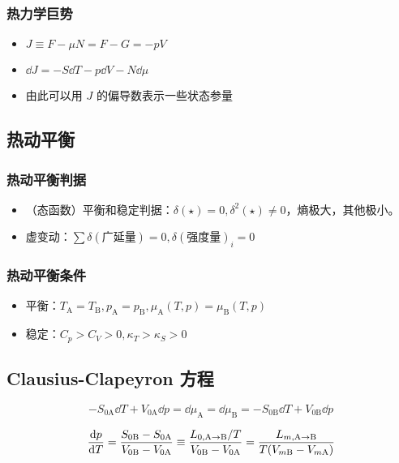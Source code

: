 \subsubsection{热力学巨势}
\begin{itemize}
    \item $J \equiv F - \mu N = F - G = - p V$
    \item $\dd{J} = -S \dd{T} - p \dd{V} - N \dd{\mu}$
    \item 由此可以用 $J$ 的偏导数表示一些状态参量
\end{itemize}

\subsection{热动平衡}

\subsubsection{热动平衡判据}

\begin{itemize}
    \item （态函数）平衡和稳定判据：$\delta (\star) = 0, \delta^2 (\star) \neq 0$，熵极大，其他极小。
    \item 虚变动：$\sum \delta (\text{广延量}) = 0, \delta (\text{强度量})_i = 0$
\end{itemize}

\subsubsection{热动平衡条件}

\begin{itemize}
    \item 平衡：$T_{\text{A}} = T_{\text{B}}, p_{\text{A}} = p_{\text{B}}, \mu_{\text{A}} (T, p) = \mu_{\text{B}} (T, p)$
    \item 稳定：$C_p > C_V > 0, \kappa_T > \kappa_S > 0$
\end{itemize}

\subsection{Clausius-Clapeyron 方程}

\[
    - S_{0\text{A}} \dd{T} + V_{0\text{A}} \dd{p} = \dd{\mu_\text{A}} = \dd{\mu_\text{B}} = - S_{0\text{B}} \dd{T} + V_{0\text{B}} \dd{p}
\]

\[
    \dv{p}{T} = \frac{S_{0\text{B}} - S_{0\text{A}}}{V_{0\text{B}} - V_{0\text{A}}} \equiv \frac{L_{0, \text{A} \rightarrow \text{B}} / T}{V_{0\text{B}} - V_{0\text{A}}} = \frac{L_{m, \text{A} \rightarrow \text{B}}}{T (V_{m\text{B}} - V_{m\text{A}})}
\]

